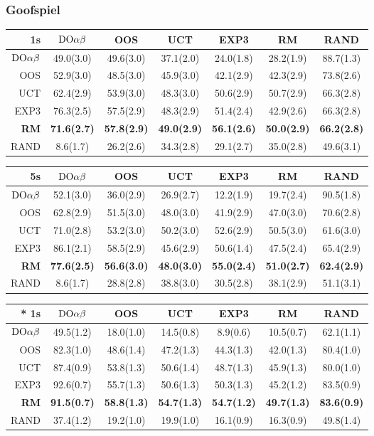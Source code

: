 \subsubsection{Goofspiel}

\begin{table}
\centering
\begin{scriptsize}
\begin{tabular}{|r|cccccc|}\hline
1s&$\textrm{DO}\alpha\beta$&OOS&UCT&EXP3&RM&RAND\\\hline
$\textrm{DO}\alpha\beta$&49.0(3.0)&49.6(3.0)&37.1(2.0)&24.0(1.8)&28.2(1.9)&88.7(1.3)\\
OOS&52.9(3.0)&48.5(3.0)&45.9(3.0)&42.1(2.9)&42.3(2.9)&73.8(2.6)\\
UCT&62.4(2.9)&53.9(3.0)&48.3(3.0)&50.6(2.9)&50.7(2.9)&66.3(2.8)\\
EXP3&76.3(2.5)&57.5(2.9)&48.3(2.9)&51.4(2.4)&42.9(2.6)&66.3(2.8)\\
\textbf{RM}&\textbf{71.6(2.7)}&\textbf{57.8(2.9)}&\textbf{49.0(2.9)}&\textbf{56.1(2.6)}&\textbf{50.0(2.9)}&\textbf{66.2(2.8)}\\
RAND&8.6(1.7)&26.2(2.6)&34.3(2.8)&29.1(2.7)&35.0(2.8)&49.6(3.1)\\
\hline
\end{tabular}
\begin{tabular}{|r|cccccc|}\hline
5s&$\textrm{DO}\alpha\beta$&OOS&UCT&EXP3&RM&RAND\\\hline
$\textrm{DO}\alpha\beta$&52.1(3.0)&36.0(2.9)&26.9(2.7)&12.2(1.9)&19.7(2.4)&90.5(1.8)\\
OOS&62.8(2.9)&51.5(3.0)&48.0(3.0)&41.9(2.9)&47.0(3.0)&70.6(2.8)\\
UCT&71.0(2.8)&53.2(3.0)&50.2(3.0)&52.6(2.9)&50.5(3.0)&61.6(3.0)\\
EXP3&86.1(2.1)&58.5(2.9)&45.6(2.9)&50.6(1.4)&47.5(2.4)&65.4(2.9)\\
\textbf{RM}&\textbf{77.6(2.5)}&\textbf{56.6(3.0)}&\textbf{48.0(3.0)}&\textbf{55.0(2.4)}&\textbf{51.0(2.7)}&\textbf{62.4(2.9)}\\
RAND&8.6(1.7)&28.8(2.8)&38.8(3.0)&30.5(2.8)&38.1(2.9)&51.1(3.1)\\
\hline
\end{tabular}

\begin{tabular}{|r|cccccc|}\hline
* 1s&$\textrm{DO}\alpha\beta$&OOS&UCT&EXP3&RM&RAND\\\hline
$\textrm{DO}\alpha\beta$&49.5(1.2)&18.0(1.0)&14.5(0.8)&8.9(0.6)&10.5(0.7)&62.1(1.1)\\
OOS&82.3(1.0)&48.6(1.4)&47.2(1.3)&44.3(1.3)&42.0(1.3)&80.4(1.0)\\
UCT&87.4(0.9)&53.8(1.3)&50.6(1.4)&48.7(1.3)&45.9(1.3)&80.0(1.0)\\
EXP3&92.6(0.7)&55.7(1.3)&50.6(1.3)&50.3(1.3)&45.2(1.2)&83.5(0.9)\\
\textbf{RM}&\textbf{91.5(0.7)}&\textbf{58.8(1.3)}&\textbf{54.7(1.3)}&\textbf{54.7(1.2)}&\textbf{49.7(1.3)}&\textbf{83.6(0.9)}\\
RAND&37.4(1.2)&19.2(1.0)&19.9(1.0)&16.1(0.9)&16.3(0.9)&49.8(1.4)\\
\hline
\end{tabular}


\end{scriptsize}
\end{table}
